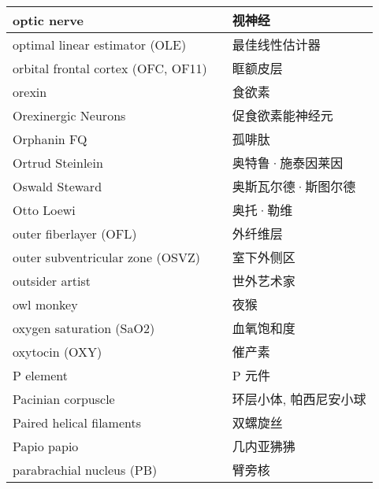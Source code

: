 \begin{longtable}{lll}
	\midrule
	optic nerve     && 视神经   \\
	
	\midrule
	optimal linear estimator (OLE)    && 最佳线性估计器   \\
	
	\midrule
	orbital frontal cortex (OFC, OF11)   && 眶额皮层 \\
	
	\midrule
	orexin  && 食欲素 \\
	
	\midrule
	Orexinergic Neurons  && 促食欲素能神经元 \\
	
	\midrule
	Orphanin FQ     && 孤啡肽   \\
	
	\midrule
	Ortrud Steinlein     && 奥特鲁·施泰因莱因   \\
	
	\midrule
	Oswald Steward     && 奥斯瓦尔德·斯图尔德   \\
	
	\midrule
	Otto Loewi     && 奥托·勒维   \\
	
	\midrule
	outer fiberlayer (OFL)     && 外纤维层   \\
	
	\midrule
	outer subventricular zone (OSVZ)     && 室下外侧区   \\
	
	\midrule
	outsider artist     && 世外艺术家   \\
	
	\midrule
	owl monkey     && 夜猴   \\
	
	\midrule
	oxygen saturation (SaO2)     && 血氧饱和度   \\
	
	\midrule
	oxytocin (OXY)    && 催产素	   \\
	
	\midrule
	P element  && P 元件   \\
	
	\midrule
	Pacinian corpuscle  && 环层小体, 帕西尼安小球   \\
	
	\midrule
	Paired helical filaments  && 双螺旋丝   \\
	
	\midrule
	Papio papio  && 几内亚狒狒   \\
	
	\midrule
	parabrachial nucleus (PB) && 臂旁核   \\
	

\end{longtable}
